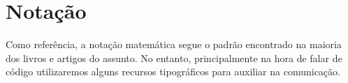 \chapter{Notação}
   Como referência, a notação matemática segue o padrão encontrado na maioria dos livros e artigos do assunto. No entanto, principalmente na hora de falar de código utilizaremos alguns recursos tipográficos para auxiliar na comunicação. \par